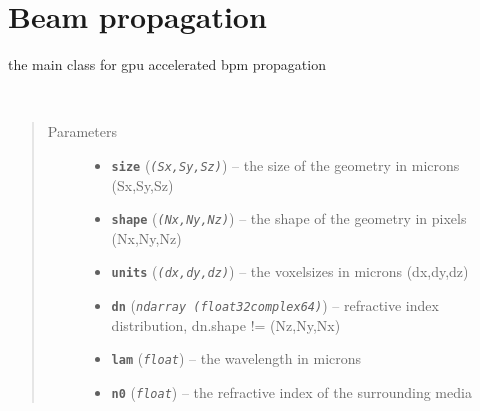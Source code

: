 \documentclass[a4paper,10pt,english]{sphinxmanual}
\begin{document}
\section{Beam propagation}
\label{basic:beam-propagation}

\begin{fulllineitems}
\label{basic:biobeam.Bpm3d}
the main class for gpu accelerated bpm propagation

\begin{fulllineitems}
\label{basic:biobeam.Bpm3d.__init__}~\begin{quote}\begin{description}
\item[{Parameters}] \leavevmode\begin{itemize}
\item {} 
\textbf{\texttt{size}} (\emph{\texttt{(Sx,Sy,Sz)}}) -- the size of the geometry in microns (Sx,Sy,Sz)

\item {} 
\textbf{\texttt{shape}} (\emph{\texttt{(Nx,Ny,Nz)}}) -- the shape of the geometry in pixels (Nx,Ny,Nz)

\item {} 
\textbf{\texttt{units}} (\emph{\texttt{(dx,dy,dz)}}) -- the voxelsizes in microns (dx,dy,dz)

\item {} 
\textbf{\texttt{dn}} (\emph{\texttt{ndarray (float32\textbar{}complex64)}}) -- refractive index distribution, dn.shape != (Nz,Ny,Nx)

\item {} 
\textbf{\texttt{lam}} (\emph{\texttt{float}}) -- the wavelength in microns

\item {} 
\textbf{\texttt{n0}} (\emph{\texttt{float}}) -- the refractive index of the surrounding media


\end{itemize}
\end{description}
\end{quote}
\end{fulllineitems}
\end{fulllineitems}
\end{document}
